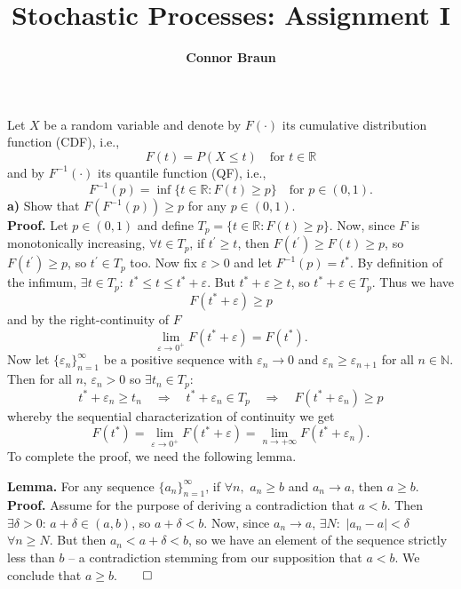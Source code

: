 \documentclass[11pt, letterpaper]{article}
\title{\bf Stochastic Processes: Assignment I}
\author{\bf Connor Braun}
\date{}
\newcommand{\mbb}[1]{\mathbb{#1}}
\begin{document}
    \maketitle
     Let $X$ be a random variable and denote by $F(\cdot)$ its cumulative distribution function (CDF), i.e.,
    \[F(t)=P(X\leq t)\quad \text{for $t\in\mbb{R}$}\]
    and by $F^{-1}(\cdot)$ its quantile function (QF), i.e.,
    \[F^{-1}(p)=\inf\{t\in\mbb{R}:F(t)\geq p\}\quad \text{for $p\in(0,1)$}.\]
    {\bf a)} Show that $F(F^{-1}(p))\geq p$ for any $p\in(0,1)$.\\[10pt]
    {\bf Proof.} Let $p\in(0,1)$ and define $T_p=\{t\in\mbb{R}:F(t)\geq p\}$. Now, since $F$ is monotonically increasing, $\forall t\in T_p$, if $t^\prime\geq t$, then $F(t^\prime)\geq F(t)\geq p$, so $F(t^\prime)\geq p$, so $t^\prime\in T_p$ too.
    Now fix $\varepsilon>0$ and let $F^{-1}(p)=t^\ast$. By definition of the infimum, $\exists t\in T_p:$ $t^\ast\leq t\leq t^\ast+\varepsilon$. But $t^\ast+\varepsilon\geq t$, so $t^\ast+\varepsilon\in T_p$. Thus we have 
    \[F(t^\ast+\varepsilon)\geq p\]
    and by the right-continuity of $F$
    \[\lim_{\varepsilon\longrightarrow 0^+}F(t^\ast+\varepsilon)=F(t^\ast).\]
    Now let $\{\varepsilon_n\}_{n=1}^\infty$ be a positive sequence with $\varepsilon_n\longrightarrow 0$ and $\varepsilon_n\geq\varepsilon_{n+1}$ for all $n\in\mbb{N}$. Then for all $n$, $\varepsilon_n>0$ so $\exists t_n\in T_p:$
    \[t^\ast+\varepsilon_n\geq t_n\quad\Rightarrow\quad t^\ast+\varepsilon_n\in T_p\quad\Rightarrow\quad F(t^\ast+\varepsilon_n)\geq p\]
    whereby the sequential characterization of continuity we get
    \[F(t^\ast)=\lim_{\varepsilon\longrightarrow 0^+}F(t^\ast+\varepsilon)=\lim_{n\longrightarrow+\infty}F(t^\ast+\varepsilon_n).\]
    To complete the proof, we need the following lemma.\\[3pt]
    \begin{center}
        \begin{minipage}[c]{0.85\linewidth}
            {\bf Lemma.} For any sequence $\{a_n\}_{n=1}^\infty$, if $\forall n,$ $a_n\geq b$ and $a_n\longrightarrow a$, then $a\geq b$.\\[10pt]
            {\bf Proof.} Assume for the purpose of deriving a contradiction that $a<b$. Then $\exists\delta>0$: $a+\delta\in(a,b)$, so $a+\delta<b$. Now, since
            $a_n\longrightarrow a$, $\exists N:$ $|a_n-a|<\delta$ $\forall n\geq N$. But then $a_n<a+\delta<b$, so we have an element of the sequence strictly less than $b$ --
            a contradiction stemming from our supposition that $a<b$. We conclude that $a\geq b$.\hfill{$\qed$}
        \end{minipage}
    \end{center}\vspace{10pt}
\end{document}
